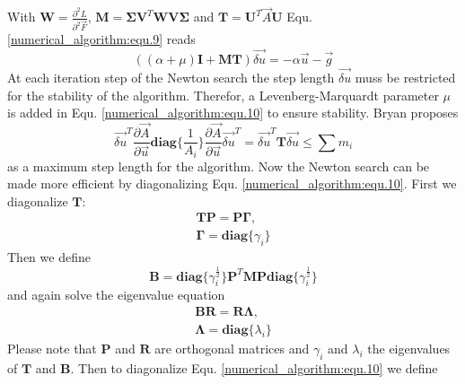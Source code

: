 With $\mathbf{W} = \frac{\partial^2 L}{\partial^2 \vec F}$, $\mathbf{M} = \mathbf{\Sigma}\mathbf{V}^T\mathbf{W}\mathbf{V}\mathbf{\Sigma}$ and $\mathbf{T} = \mathbf{U}^T \vec A \mathbf{U}$ Equ. \ref{numerical_algorithm:equ.9} reads
\begin{equation}
	((\alpha + \mu) \mathbf{I} + \mathbf{M}\mathbf{T}) \vec{\delta u} = -\alpha \vec u - \vec g
	\label{numerical_algorithm:equ.10}
\end{equation}
At each iteration step of the Newton search the step length $\vec{\delta u}$ muss be restricted for the stability of the algorithm.
Therefor, a Levenberg-Marquardt parameter $\mu$ is added in Equ. \ref{numerical_algorithm:equ.10} to ensure stability.\newline
Bryan proposes 
\begin{equation}
	\vec{\delta u}^T \frac{\partial \vec A}{\partial \vec u}\mathbf{diag}\{\frac{1}{A_i}\}\frac{\partial \vec A}{\partial \vec u}
	\vec{\delta u}^T = \vec{\delta u}^T \mathbf{T} \vec{\delta u} \leq \sum m_i
	\label{numerical_algorithm:Bryans_norm}
\end{equation}
as a maximum step length for the algorithm.\newline
Now the Newton search can be made more efficient by diagonalizing Equ. \ref{numerical_algorithm:equ.10}. First we diagonalize $\mathbf{T}$:
\begin{equation}
	\begin{gathered}
		\mathbf{T} \mathbf{P} = \mathbf{P} \mathbf{\Gamma},\\
		\mathbf{\Gamma} = \mathbf{diag} \{\gamma_i\}
	\end{gathered}
	\label{numerical_algorithm:equ.11}
\end{equation}
Then we define
\begin{equation}
	\mathbf{B} = \mathbf{diag} \{ \gamma_i^{\frac{1}{2}}\}\mathbf{P}^T \mathbf{M}\mathbf{P}\mathbf{diag}\{ \gamma_i^{\frac{1}{2}}\}
	\label{numerical_algorithm:equ.12}
\end{equation}
and again solve the eigenvalue equation
\begin{equation}
	\begin{gathered}
		\mathbf{B} \mathbf{R} = \mathbf{R} \mathbf{\Lambda},\\
		\mathbf{\Lambda} = \mathbf{diag} \{\lambda_i\}
	\end{gathered}
	\label{numerical_algorithm:equ.13}
\end{equation}
Please note that $\mathbf{P}$ and $\mathbf{R}$ are orthogonal matrices and $\gamma_i$ and $\lambda_i$ the eigenvalues of $\mathbf{T}$ and $\mathbf{B}$. Then to diagonalize Equ. \ref{numerical_algorithm:equ.10} we define 
